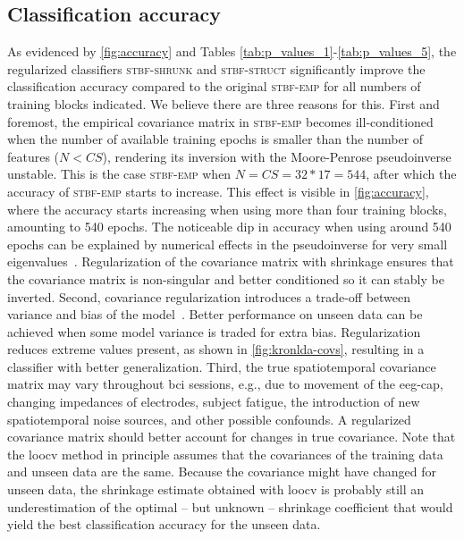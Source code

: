 	\subsection{Classification accuracy}
	As evidenced by \cref{fig:accuracy} and Tables \ref{tab:p_values_1}-\ref{tab:p_values_5}, the regularized classifiers \textsc{stbf-shrunk}
	and \textsc{stbf-struct} significantly improve the classification accuracy
	compared to the original \textsc{stbf-emp} for all numbers of training blocks
	indicated.
	We believe there are three reasons for this.
	First and foremost, the empirical covariance matrix in \textsc{stbf-emp} becomes
	ill-conditioned when the number of available training epochs is smaller than
	the number of features ($N<CS$), rendering its inversion with the
	Moore-Penrose pseudoinverse unstable.
	This is the case \textsc{stbf-emp} when $N=CS=32*17=544$, after which the
	accuracy of \textsc{stbf-emp} starts to increase.
	This effect is visible in \cref{fig:accuracy}, where the accuracy starts
	increasing when using more than four training blocks, amounting to 540 epochs.
	The noticeable dip in accuracy when using around 540 epochs can be explained by
	numerical effects in the pseudoinverse for very small
	eigenvalues~\cite{Blankertz2011, Raudys1998, Schaefer2004,
		Kraemer2009}.
	Regularization of the covariance matrix with shrinkage ensures that the
	covariance matrix is non-singular and better conditioned so it can stably be inverted.
	Second, covariance regularization introduces a trade-off between variance and bias of the model~\cite{Ledoit2004}.
	Better performance on unseen data can be achieved when some model variance is
	traded for extra bias.
	Regularization reduces extreme values present, as shown in
	\cref{fig:kronlda-covs}, resulting in a classifier with
	better generalization.
	Third, the true spatiotemporal covariance matrix may vary throughout \ac{bci}
	sessions, e.g., due to movement of the \ac{eeg}-cap, changing impedances of
	electrodes, subject fatigue, the introduction of new spatiotemporal noise
	sources, and other possible confounds.
	A regularized covariance matrix should better account for changes in true covariance.
	Note that the \ac{loocv} method in principle assumes that the covariances of
	the training data and unseen data are the same.
	Because the covariance might have changed for unseen data, the shrinkage
	estimate obtained with \ac{loocv} is probably still an
	underestimation of the optimal -- but unknown -- shrinkage coefficient that
	would yield the best classification accuracy for the unseen data.

